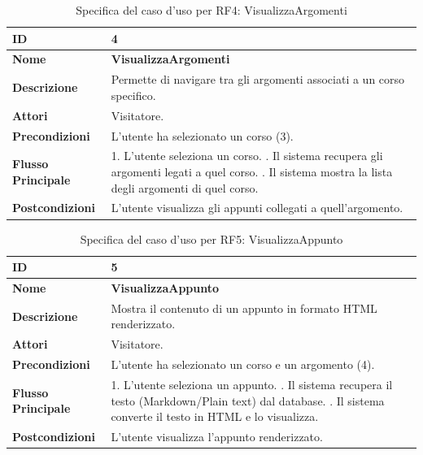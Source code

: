 \begin{table}[H]
    \small
    \caption{Specifica del caso d'uso per RF4: VisualizzaArgomenti}
    \begin{tabularx}{\textwidth}{@{}l X@{}}
        \toprule
        \textbf{ID} & 4 \\
        \midrule
        \textbf{Nome} & \textbf{VisualizzaArgomenti} \\
        \midrule
        \textbf{Descrizione} & Permette di navigare tra gli argomenti associati a un corso specifico. \\
        \midrule
        \textbf{Attori} & Visitatore. \\
        \midrule
        \textbf{Precondizioni} & L'utente ha selezionato un corso (3). \\
        \midrule
        \textbf{Flusso Principale} & 
        1. L'utente seleziona un corso. \newline
        2. Il sistema recupera gli argomenti legati a quel corso. \newline
        3. Il sistema mostra la lista degli argomenti di quel corso. \\
        \midrule
        \textbf{Postcondizioni} & L'utente visualizza gli appunti collegati a quell'argomento. \\
        \bottomrule
    \end{tabularx}
\end{table}

\begin{table}[H]
    \small
    \caption{Specifica del caso d'uso per RF5: VisualizzaAppunto}
    \begin{tabularx}{\textwidth}{@{}l X@{}}
        \toprule
        \textbf{ID} & 5 \\
        \midrule
        \textbf{Nome} & \textbf{VisualizzaAppunto} \\
        \midrule
        \textbf{Descrizione} & Mostra il contenuto di un appunto in formato HTML renderizzato. \\
        \midrule
        \textbf{Attori} & Visitatore. \\
        \midrule
        \textbf{Precondizioni} & L'utente ha selezionato un corso e un argomento (4). \\
        \midrule
        \textbf{Flusso Principale} & 
        1. L'utente seleziona un appunto. \newline
        2. Il sistema recupera il testo (Markdown/Plain text) dal database. \newline
        3. Il sistema converte il testo in HTML e lo visualizza. \\
        \midrule
        \textbf{Postcondizioni} & L'utente visualizza l'appunto renderizzato. \\
        \bottomrule
    \end{tabularx}
\end{table}

